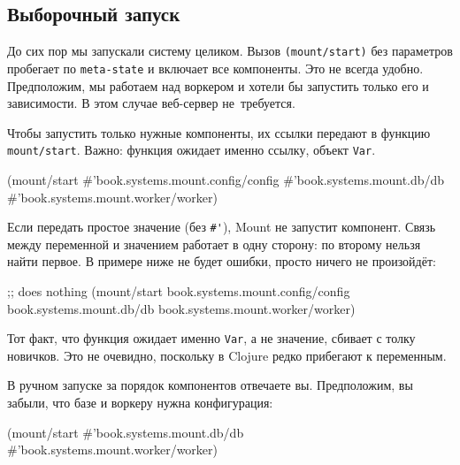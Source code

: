 \subsection{Выборочный запуск}

\label{mount-selective}

До сих пор мы запускали систему целиком. Вызов \verb|(mount/start)| без
параметров пробегает по \verb|meta-state| и включает все компоненты. Это не
всегда удобно. Предположим, мы работаем над воркером и хотели бы запустить
только его и зависимости. В этом случае веб-сервер не~требуется.

Чтобы запустить только нужные компоненты, их ссылки передают в функцию
\verb|mount/start|. Важно: функция ожидает именно ссылку, объект \verb|Var|.

\begin{english}
  \begin{clojure}
(mount/start
  #'book.systems.mount.config/config
  #'book.systems.mount.db/db
  #'book.systems.mount.worker/worker)
  \end{clojure}
\end{english}

Если передать простое значение (без \verb|#'|), Mount не запустит
компонент. Связь между переменной и значением работает в одну сторону: по
второму нельзя найти первое. В примере ниже не будет ошибки, просто ничего не
произойдёт:

\pagebreakafive

\begin{english}
  \begin{clojure}
;; does nothing
(mount/start
  book.systems.mount.config/config
  book.systems.mount.db/db
  book.systems.mount.worker/worker)
  \end{clojure}
\end{english}


Тот факт, что функция ожидает именно \verb|Var|, а не значение, сбивает с толку
новичков. Это не очевидно, поскольку в Clojure редко прибегают к переменным.

В ручном запуске за порядок компонентов отвечаете вы. Предположим, вы забыли,
что базе и воркеру нужна конфигурация:

\begin{english}
  \begin{clojure}
(mount/start
  #'book.systems.mount.db/db
  #'book.systems.mount.worker/worker)
  \end{clojure}
\end{english}

